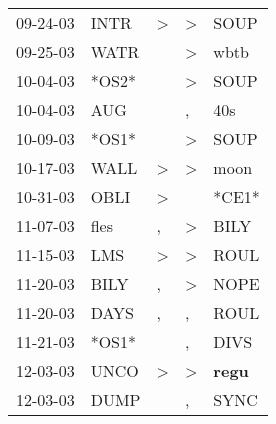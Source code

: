 \begin{supertabular}{p{0.07\textwidth}p{0.06\textwidth}p{0.02\textwidth}p{0.02\textwidth}p{0.06\textwidth}}
          09-24-03\textsuperscript{} &           INTR\textsuperscript{} &     \textgreater &     \textgreater &           SOUP\textsuperscript{} \\
          09-25-03\textsuperscript{} &           WATR\textsuperscript{} &                  &     \textgreater &           wbtb\textsuperscript{} \\
          10-04-03\textsuperscript{} &                            *OS2* &                  &     \textgreater &           SOUP\textsuperscript{} \\
          10-04-03\textsuperscript{} &            AUG\textsuperscript{} &                  &                , &            40s\textsuperscript{} \\
          10-09-03\textsuperscript{} &                            *OS1* &                  &     \textgreater &           SOUP\textsuperscript{} \\
          10-17-03\textsuperscript{} &           WALL\textsuperscript{} &     \textgreater &     \textgreater &           moon\textsuperscript{} \\
          10-31-03\textsuperscript{} &           OBLI\textsuperscript{} &     \textgreater &                  &                            *CE1* \\
          11-07-03\textsuperscript{} &           fles\textsuperscript{} &                , &     \textgreater &           BILY\textsuperscript{} \\
          11-15-03\textsuperscript{} &            LMS\textsuperscript{} &     \textgreater &     \textgreater &           ROUL\textsuperscript{} \\
          11-20-03\textsuperscript{} &           BILY\textsuperscript{} &                , &     \textgreater &           NOPE\textsuperscript{} \\
          11-20-03\textsuperscript{} &           DAYS\textsuperscript{} &                , &                , &           ROUL\textsuperscript{} \\
          11-21-03\textsuperscript{} &                            *OS1* &                  &                , &           DIVS\textsuperscript{} \\
          12-03-03\textsuperscript{} &           UNCO\textsuperscript{} &     \textgreater &     \textgreater &  \textbf{regu\textsuperscript{}} \\
          12-03-03\textsuperscript{} &           DUMP\textsuperscript{} &                  &                , &           SYNC\textsuperscript{} \\

\end{supertabular}
